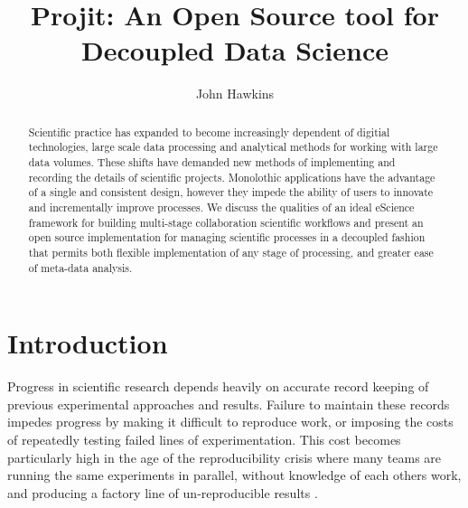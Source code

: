 \documentclass[sigconf]{acmart}
\begin{document}
\title{Projit: An Open Source tool for Decoupled Data Science}

\author{John Hawkins}

\renewcommand{\shortauthors}{Hawkins}

\begin{abstract} 
Scientific practice has expanded to become increasingly dependent of digitial technologies,
large scale data processing and analytical methods for working with large data volumes. 
These shifts have demanded new methods of implementing and recording the details of 
scientific projects. Monolothic applications have the advantage of a single and 
consistent design, however they impede the ability of users to innovate and 
incrementally improve processes. We discuss the qualities of an ideal eScience 
framework for building multi-stage collaboration scientific workflows and present 
an open source implementation for managing scientific processes in a decoupled 
fashion that permits both flexible implementation of any stage of processing, 
and greater ease of meta-data analysis.
\end{abstract}



\maketitle

\section{Introduction}

Progress in scientific research depends heavily on accurate record keeping of previous
experimental approaches and results. Failure to maintain these records impedes progress
by making it difficult to reproduce work, or imposing the costs of repeatedly testing 
failed lines of experimentation. This cost becomes particularly high in the age of the
reproducibility crisis where many teams are running the same experiments in parallel, without
knowledge of each others work, and producing a factory line of un-reproducible results 
\cite{Ioannidis2005}.
 
\end{document}
